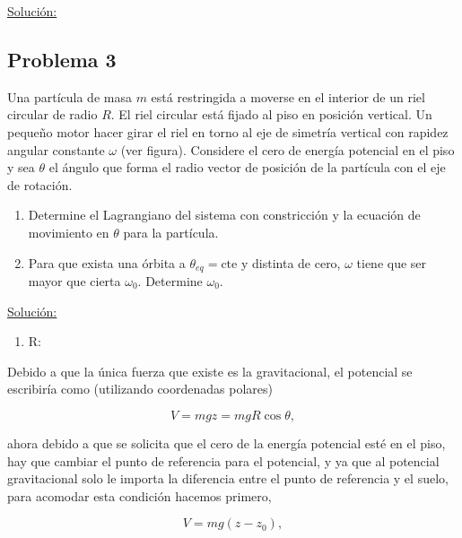 \documentclass[a4paper,10pt]{article}
\numberwithin{equation}{section}
\begin{document}
\underline{Solución:} \vspace{.3cm}

\subsection{Problema 3}

Una partícula de masa $m$ está restringida a moverse en el interior de un riel circular 
de radio $R$. El riel circular está fijado al piso en posición vertical. Un pequeño 
motor hacer girar el riel en torno al eje de simetría vertical con rapidez angular 
constante $\omega$ (ver figura). Considere el cero de energía potencial en el piso y 
sea $\theta$ el ángulo que forma el radio vector de posición de la partícula con el 
eje de rotación.

\begin{enumerate}[label=\alph*)]
 \item Determine el Lagrangiano del sistema con constricción y la ecuación de movimiento 
 en $\theta$ para la partícula.
 \item Para que exista una órbita a $\theta_{eq}= \text{cte}$ y distinta de cero, $\omega$
 tiene que ser mayor que cierta $\omega_0$. Determine $\omega_0$.
\end{enumerate}

\vspace{.3cm}

\underline{Solución:} \vspace{.3cm}

\begin{enumerate}[label=\alph*)]
 \item R:
\end{enumerate}

Debido a que la única fuerza que existe es la gravitacional, el potencial se 
escribiría como (utilizando coordenadas polares)

\begin{equation}
 V = mgz = mgR\cos{\theta},
\end{equation}

ahora debido a que se solicita que el cero de la energía potencial esté en el piso, 
hay que cambiar el punto de referencia para el potencial, y ya que al potencial 
gravitacional solo le importa la diferencia entre el punto de referencia y el suelo, 
para acomodar esta condición hacemos primero,

\begin{equation}
 V = mg(z - z_0),
\end{equation}
\end{document}
